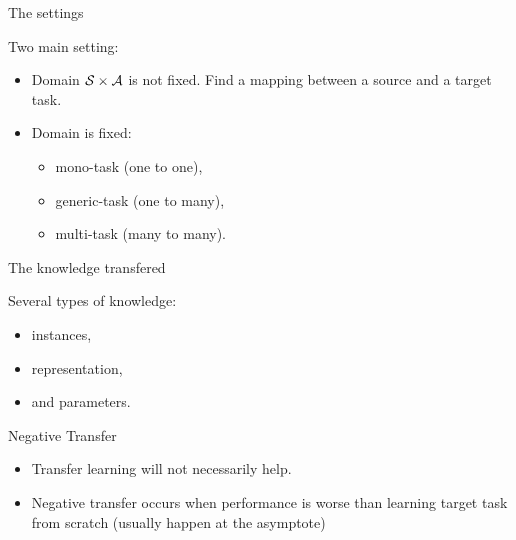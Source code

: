 \documentclass{beamer}
\begin{document}
    \begin{frame}{The settings}

        Two main setting:

        \begin{itemize}
            \item Domain $\mathcal{S}\times \mathcal{A}$ is not fixed. Find a mapping between a source and a target task.
            \item Domain is fixed:
            \begin{itemize}
                \item mono-task (one to one),
                \item generic-task (one to many),
                \item multi-task  (many to many).
            \end{itemize}
        \end{itemize}

    \end{frame}

    \begin{frame}{The knowledge transfered}

        Several types of knowledge:
        \begin{itemize}
            \item instances, %
            \item representation, %
            \item and parameters. %
        \end{itemize}

    \end{frame}

    \begin{frame}{Negative Transfer}

        \begin{itemize}
            \item Transfer learning will not necessarily help.
            \item Negative transfer occurs when performance is worse than learning
            target task from scratch (usually happen at the asymptote)
        \end{itemize}

    \end{frame}
\end{document}
